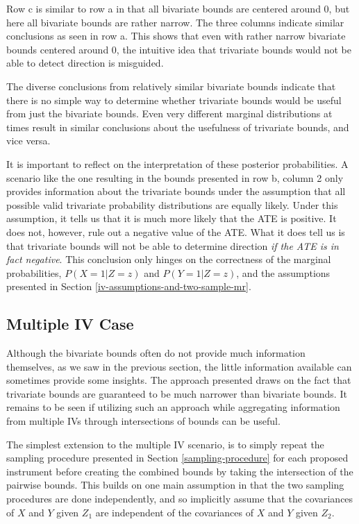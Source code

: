 \documentclass[
]{article}
\theoremstyle{plain}
\begin{document}
{Row c is similar to row a in that all bivariate bounds are centered around 0, but here all bivariate bounds are rather narrow. The three columns indicate similar conclusions as seen in row a. This shows that even with rather narrow bivariate bounds centered around 0, the intuitive idea that trivariate bounds would not be able to detect direction is misguided.

The diverse conclusions from relatively similar bivariate bounds indicate that there is no simple way to determine whether trivariate bounds would be useful from just the bivariate bounds. Even very different marginal distributions at times result in similar conclusions about the usefulness of trivariate bounds, and vice versa.

It is important to reflect on the interpretation of these posterior probabilities. A scenario like the one resulting in the bounds presented in row b, column 2 only provides information about the trivariate bounds under the assumption that all possible valid trivariate probability distributions are equally likely. Under this assumption, it tells us that it is much more likely that the ATE is positive. It does not, however, rule out a negative value of the ATE. What it does tell us is that trivariate bounds will not be able to determine direction \emph{if the ATE is in fact negative}. This conclusion only hinges on the correctness of the marginal probabilities, \(P(X = 1 | Z = z)\) and \(P(Y = 1 | Z = z)\), and the assumptions presented in Section \ref{iv-assumptions-and-two-sample-mr}.

\hypertarget{multiple-iv-case}{%
\subsection{Multiple IV Case}\label{multiple-iv-case}}

Although the bivariate bounds often do not provide much information themselves, as we saw in the previous section, the little information available can sometimes provide some insights. The approach presented draws on the fact that trivariate bounds are guaranteed to be much narrower than bivariate bounds. It remains to be seen if utilizing such an approach while aggregating information from multiple IVs through intersections of bounds can be useful.

The simplest extension to the multiple IV scenario, is to simply repeat the sampling procedure presented in Section \ref{sampling-procedure} for each proposed instrument before creating the combined bounds by taking the intersection of the pairwise bounds. This builds on one main assumption in that the two sampling procedures are done independently, and so implicitly assume that the covariances of \(X\) and \(Y\) given \(Z_1\) are independent of the covariances of \(X\) and \(Y\) given \(Z_2\).

}
\end{document}
